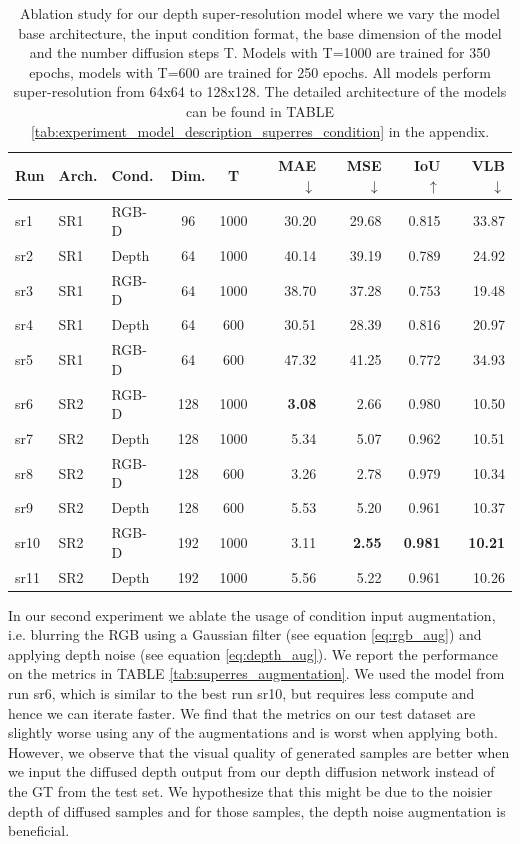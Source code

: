 \begin{table}[t]
\tiny
\centering
\caption{Ablation study for our depth super-resolution model where we vary the model base architecture, the input condition format, the base dimension of the model and the number diffusion steps T. Models with T=1000 are trained for 350 epochs, models with T=600 are trained for 250 epochs. All models perform super-resolution from 64x64 to 128x128. The detailed architecture of the models can be found in TABLE \ref{tab:experiment_model_description_superres_condition} in the appendix.}
\label{tab:superres_condition_and_hyperparams}
\begin{tabular}{ l | l l c c | r | r | r | r }
\hline
\textbf{Run} & \textbf{Arch.} & \textbf{Cond.} & \textbf{Dim.} & \textbf{T} & \textbf{MAE} $\downarrow$ & \textbf{MSE} $\downarrow$ & \textbf{IoU} $\uparrow$ & \textbf{VLB} $\downarrow$ \\ 
\hline
\hline
sr1 & SR1 & RGB-D & 96 & 1000 & 30.20 & 29.68 & 0.815 & 33.87 \\ 
sr2 & SR1 & Depth & 64 & 1000 & 40.14 & 39.19 & 0.789 & 24.92 \\ 
sr3 & SR1 & RGB-D & 64 & 1000 & 38.70 & 37.28 & 0.753 & 19.48 \\ 
sr4 & SR1 & Depth & 64 & 600 & 30.51 & 28.39 & 0.816 & 20.97 \\ 
sr5 & SR1 & RGB-D & 64 & 600 & 47.32 & 41.25 & 0.772 & 34.93 \\
\hline
sr6 & SR2 & RGB-D & 128 & 1000 & \textbf{3.08} & 2.66 & 0.980 & 10.50 \\ 
sr7 & SR2 & Depth & 128 & 1000 & 5.34 & 5.07 & 0.962 & 10.51 \\ 
sr8 & SR2 & RGB-D & 128 & 600 & 3.26 & 2.78 & 0.979 & 10.34 \\ 
sr9 & SR2 & Depth & 128 & 600 & 5.53 & 5.20 & 0.961 & 10.37 \\ 
sr10 & SR2 & RGB-D & 192 & 1000 & 3.11 & \textbf{2.55} & \textbf{0.981} & \textbf{10.21} \\ 
sr11 & SR2 & Depth & 192 & 1000 & 5.56 & 5.22 & 0.961 & 10.26 \\ 
\hline
\end{tabular}
\end{table}

In our second experiment we ablate the usage of condition input augmentation, i.e. blurring the RGB using a Gaussian filter (see equation \eqref{eq:rgb_aug}) and applying depth noise (see equation \eqref{eq:depth_aug}). We report the performance on the metrics in TABLE \ref{tab:superres_augmentation}. We used the model from run sr6, which is similar to the best run sr10, but requires less compute and hence we can iterate faster. We find that the metrics on our test dataset are slightly worse using any of the augmentations and is worst when applying both. However, we observe that the visual quality of generated samples are better when we input the diffused depth output from our depth diffusion network instead of the GT from the test set. We hypothesize that this might be due to the noisier depth of diffused samples and for those samples, the depth noise augmentation is beneficial.

